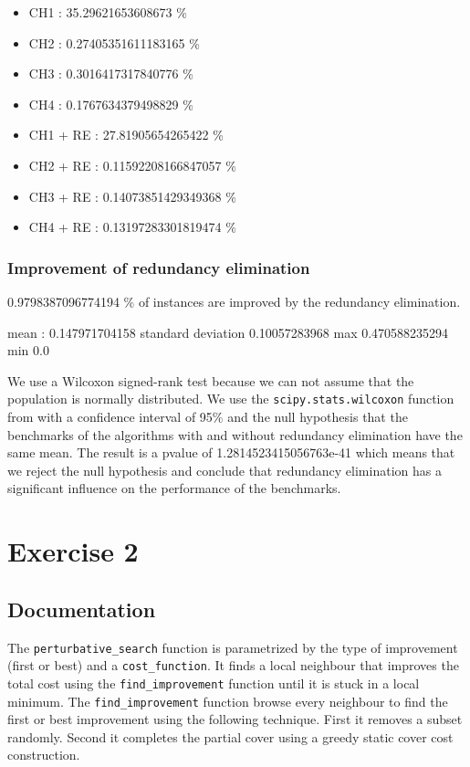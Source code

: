 \documentclass[a4paper,12pt]{article}
\begin{document}
\begin{itemize}
    \item CH1 : 35.29621653608673 \%
    \item CH2 : 0.27405351611183165 \%
    \item CH3 : 0.3016417317840776 \%
    \item CH4 : 0.1767634379498829 \%
    \item CH1 + RE : 27.81905654265422 \%
    \item CH2 + RE : 0.11592208166847057 \%
    \item CH3 + RE : 0.14073851429349368 \%
    \item CH4 + RE : 0.13197283301819474 \%
\end{itemize}

\subsubsection{Improvement of redundancy elimination}

0.9798387096774194 \% of instances are improved by the redundancy elimination.

mean : 0.147971704158
standard deviation 0.10057283968
max 0.470588235294
min 0.0

We use a Wilcoxon signed-rank test because we can not assume that the population is normally distributed. We use the \texttt{scipy.stats.wilcoxon} function from \cite{scipywilcoxon} with a confidence interval of 95\% and the null hypothesis that the benchmarks of the algorithms with and without redundancy elimination have the same mean.
The result is a pvalue of 1.2814523415056763e-41 which means that we reject the null hypothesis and conclude that redundancy elimination has a significant influence on the performance of the benchmarks.

\section{Exercise 2}

\subsection{Documentation}

The \texttt{perturbative\_search} function is parametrized by the type of improvement (first or best) and a \texttt{cost\_function}. It finds a local neighbour that improves the total cost using the \texttt{find\_improvement} function until it is stuck in a local minimum.
The \texttt{find\_improvement} function browse every neighbour to find the first or best improvement using the following technique. First it removes a subset randomly. Second it completes the partial cover using a greedy static cover cost construction.
\end{document}
